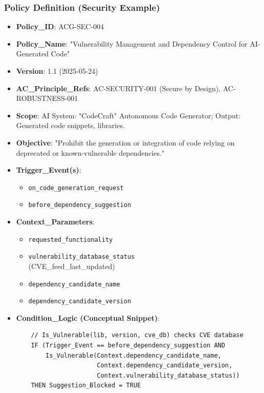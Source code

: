 \documentclass[sigconf,review,anonymous=false]{acmart} %
\begin{document}
\subsubsection{Policy Definition (Security Example)}
\begin{itemize}
    \item \textbf{Policy\_ID}: ACG-SEC-004
    \item \textbf{Policy\_Name}: "Vulnerability Management and Dependency Control for AI-Generated Code"
    \item \textbf{Version}: 1.1 (2025-05-24)
    \item \textbf{AC\_Principle\_Refs}: AC-SECURITY-001 (Secure by Design), AC-ROBUSTNESS-001
    \item \textbf{Scope}: AI System: "CodeCraft" Autonomous Code Generator; Output: Generated code snippets, libraries.
    \item \textbf{Objective}: "Prohibit the generation or integration of code relying on deprecated or known-vulnerable dependencies."
    \item \textbf{Trigger\_Event(s)}:
    \begin{itemize}
        \item \texttt{on\_code\_generation\_request}
        \item \texttt{before\_dependency\_suggestion}
    \end{itemize}
    \item \textbf{Context\_Parameters}:
    \begin{itemize}
        \item \texttt{requested\_functionality}
        \item \texttt{vulnerability\_database\_status} \\
        (CVE\_feed\_last\_updated)
        \item \texttt{dependency\_candidate\_name}
        \item \texttt{dependency\_candidate\_version}
    \end{itemize}
    \item \textbf{Condition\_Logic (Conceptual Snippet)}:
    {\scriptsize
    \begin{verbatim}
    // Is_Vulnerable(lib, version, cve_db) checks CVE database
    IF (Trigger_Event == before_dependency_suggestion AND
        Is_Vulnerable(Context.dependency_candidate_name,
                      Context.dependency_candidate_version,
                      Context.vulnerability_database_status))
    THEN Suggestion_Blocked = TRUE
    \end{verbatim}
}
\end{itemize}
\end{document}
